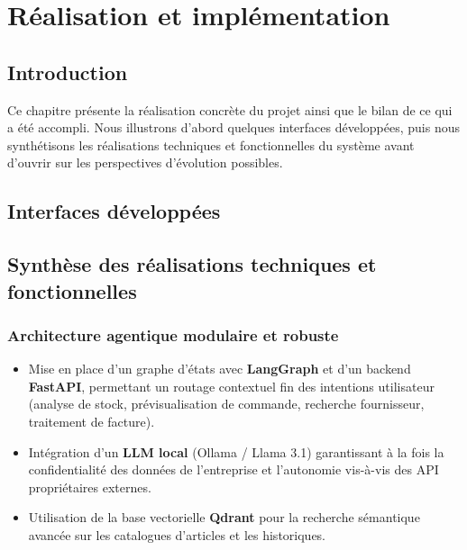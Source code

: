 \chapter{Réalisation et implémentation}

\section{Introduction}
Ce chapitre présente la réalisation concrète du projet ainsi que le bilan de ce qui a été accompli. Nous illustrons d'abord quelques interfaces développées, puis nous synthétisons les réalisations techniques et fonctionnelles du système avant d'ouvrir sur les perspectives d'évolution possibles.

\section{Interfaces développées}

\section{Synthèse des réalisations techniques et fonctionnelles}

\subsection{Architecture agentique modulaire et robuste}
\begin{itemize}
    \item Mise en place d'un graphe d'états avec \textbf{LangGraph} et d'un backend \textbf{FastAPI}, permettant un routage contextuel fin des intentions utilisateur (analyse de stock, prévisualisation de commande, recherche fournisseur, traitement de facture).
    \item Intégration d'un \textbf{LLM local} (Ollama / Llama 3.1) garantissant à la fois la confidentialité des données de l'entreprise et l'autonomie vis-à-vis des API propriétaires externes.
    \item Utilisation de la base vectorielle \textbf{Qdrant} pour la recherche sémantique avancée sur les catalogues d'articles et les historiques.
\end{itemize}

